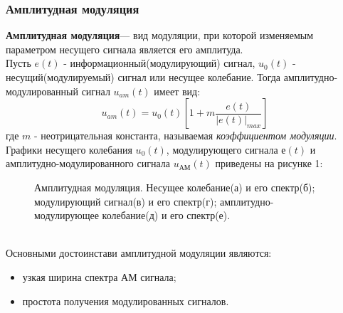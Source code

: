 \subsubsection{Амплитудная модуляция}
{\bf Амплитудная модуляция}— вид модуляции, при которой изменяемым параметром несущего сигнала является его амплитуда.\\\indent
Пусть $e(t)$ - информационный(модулирующий) сигнал, $u_0(t)$ - несущий(модулируемый) сигнал или несущее колебание. Тогда амплитудно-модулированный сигнал $u_{am}(t)$ имеет вид:$$u_{am}(t) = u_0(t)\left[1+m\frac{e(t)}{|e(t)|_{max}}\right]$$
где $m$ - неотрицательная константа, называемая {\it коэффициентом модуляции}. \\\indent
Графики несущего колебания $u_0(t)$, модулирующего сигнала $е(t)$ и амплитудно-модулированного сигнала $u_{АМ}(t)$ приведены на рисунке 1:\\
\begin{figure}[h]
\caption{Амплитудная модуляция. Несущее колебание(а) и его спектр(б); модулирующий сигнал(в) и его спектр(г); амплитудно-модулирующее колебание(д) и его спектр(е). }
\label{fig:image}
\end{figure} \\

Основными достоинстави амплитудной модуляции являются:
\begin{itemize}
	\item узкая ширина спектра АМ сигнала;
	\item простота получения модулированных сигналов.
\end{itemize}

